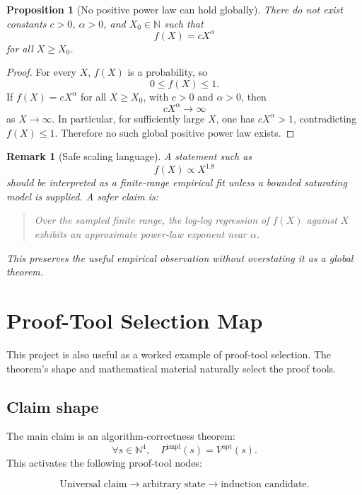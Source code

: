 \documentclass[11pt]{article}
\newtheorem{proposition}[theorem]{Proposition}
\newtheorem{remark}[theorem]{Remark}
\newcommand{\N}{\mathbb{N}}
\newcommand{\impl}{\mathrm{impl}}
\newcommand{\opt}{\mathrm{opt}}
\begin{document}
\begin{proposition}[No positive power law can hold globally]
There do not exist constants \(c>0\), \(\alpha>0\), and \(X_0\in\N\) such that
\[
    f(X)=cX^\alpha
\]
for all \(X\ge X_0\).
\end{proposition}

\begin{proof}
For every \(X\), \(f(X)\) is a probability, so
\[
    0\le f(X)\le 1.
\]
If \(f(X)=cX^\alpha\) for all \(X\ge X_0\), with \(c>0\) and \(\alpha>0\), then
\[
    cX^\alpha\to\infty
\]
as \(X\to\infty\).  In particular, for sufficiently large \(X\), one has \(cX^\alpha>1\), contradicting \(f(X)\le1\).  Therefore no such global positive power law exists.
\end{proof}

\begin{remark}[Safe scaling language]
A statement such as
\[
    f(X)\propto X^{1.8}
\]
should be interpreted as a finite-range empirical fit unless a bounded saturating model is supplied.  A safer claim is:

\begin{quote}
Over the sampled finite range, the log-log regression of \(f(X)\) against \(X\) exhibits an approximate power-law exponent near \(\alpha\).
\end{quote}

This preserves the useful empirical observation without overstating it as a global theorem.
\end{remark}

\section{Proof-Tool Selection Map}

This project is also useful as a worked example of proof-tool selection.  The theorem's shape and mathematical material naturally select the proof tools.

\subsection{Claim shape}

The main claim is an algorithm-correctness theorem:
\[
    \forall s\in\N^4,\quad P^\impl(s)=V^\opt(s).
\]
This activates the following proof-tool nodes:

\[
    \text{Universal claim}
    \longrightarrow
    \text{arbitrary state}
    \longrightarrow
    \text{induction candidate}.
\]
\end{document}
